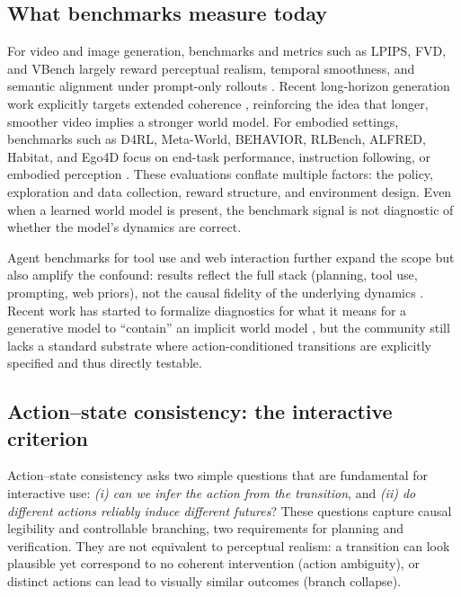 \documentclass{article}
\theoremstyle{plain}
\theoremstyle{definition}
\theoremstyle{remark}
\begin{document}
\subsection{What benchmarks measure today}
For video and image generation, benchmarks and metrics such as LPIPS, FVD, and VBench largely reward perceptual realism, temporal smoothness, and semantic alignment under prompt-only rollouts \cite{zhang2018lpips,unterthiner2019fvd,du2023vbench}. Recent long-horizon generation work explicitly targets extended coherence \cite{lu2024freelong,tan2024videoinfinity}, reinforcing the idea that longer, smoother video implies a stronger world model. For embodied settings, benchmarks such as D4RL, Meta-World, BEHAVIOR, RLBench, ALFRED, Habitat, and Ego4D focus on end-task performance, instruction following, or embodied perception \cite{fu2021d4rl,yu2020metaworld,li2022behavior,james2020rlbench,shridhar2020alfred,savva2019habitat,grauman2022ego4d}. These evaluations conflate multiple factors: the policy, exploration and data collection, reward structure, and environment design. Even when a learned world model is present, the benchmark signal is not diagnostic of whether the model's dynamics are correct.

Agent benchmarks for tool use and web interaction further expand the scope but also amplify the confound: results reflect the full stack (planning, tool use, prompting, web priors), not the causal fidelity of the underlying dynamics \cite{liu2023agentbench,xu2023toolbench,zhou2023webarena}. Recent work has started to formalize diagnostics for what it means for a generative model to ``contain'' an implicit world model \cite{vafa2024evaluating}, but the community still lacks a standard substrate where action-conditioned transitions are explicitly specified and thus directly testable.

\subsection{Action--state consistency: the interactive criterion}
Action--state consistency asks two simple questions that are fundamental for interactive use:
\emph{(i) can we infer the action from the transition}, and \emph{(ii) do different actions reliably induce different futures}? These questions capture causal legibility and controllable branching, two requirements for planning and verification. They are not equivalent to perceptual realism: a transition can look plausible yet correspond to no coherent intervention (action ambiguity), or distinct actions can lead to visually similar outcomes (branch collapse).
\end{document}
